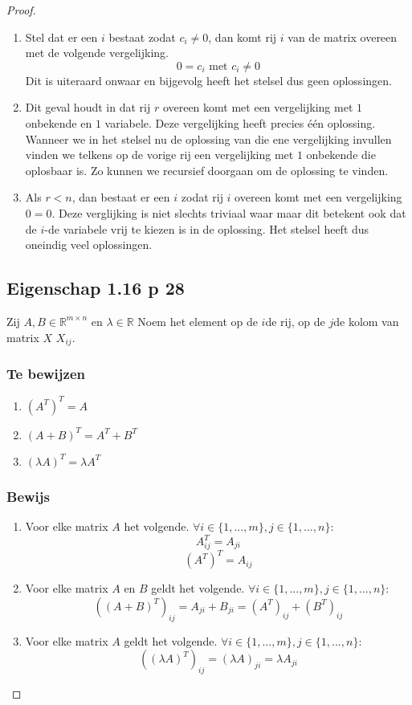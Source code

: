 \documentclass[lineaire_algebra_oplossingen.tex]{subfiles}
\begin{document}
\begin{proof}
\begin{enumerate}
\item Stel dat er een $i$ bestaat zodat $c_i \neq 0$, dan komt rij $i$ van de matrix overeen met de volgende vergelijking.
\[
0 = c_i \text{ met } c_i \neq 0
\]
Dit is uiteraard onwaar en bijgevolg heeft het stelsel dus geen oplossingen.
\item
Dit geval houdt in dat rij $r$ overeen komt met een vergelijking met $1$ onbekende en $1$ variabele. Deze vergelijking heeft precies \'e\'en oplossing. Wanneer we in het stelsel nu de oplossing van die ene vergelijking invullen vinden we telkens op de vorige rij een vergelijking met $1$ onbekende die oplosbaar is. Zo kunnen we recursief doorgaan om de oplossing te vinden.
\item
Als $r < n$, dan bestaat er een $i$ zodat rij $i$ overeen komt met een vergelijking $0=0$. Deze verglijking is niet slechts triviaal waar maar dit betekent ook dat de $i$-de variabele vrij te kiezen is in de oplossing. Het stelsel heeft dus oneindig veel oplossingen.
\end{enumerate}


\subsection{Eigenschap 1.16 p 28}
\label{1.16}
Zij $A,B \in \mathbb{R}^{m\times n} $ en $\lambda \in \mathbb{R}$
Noem het element op de $i$de rij, op de $j$de kolom van matrix $X$ $X_{ij}$.

\subsubsection*{Te bewijzen}
\begin{enumerate}
\item $(A^T)^T = A$
\item $(A+B)^T = A^T + B^T$
\item $(\lambda A)^T=\lambda A^T$
\end{enumerate}

\subsubsection*{Bewijs}
\begin{enumerate}
\item Voor elke matrix $A$ het volgende. $\forall i\in \{1,...,m\} ,j \in \{1,...,n\}:$
\[
A^T_{ij} = A_{ji}
\]
\[
(A^T)^T = A_{ij}
\]
\item Voor elke matrix $A$ en $B$ geldt het volgende. $\forall i\in \{1,...,m\} ,j \in \{1,...,n\}:$
\[
((A+B)^T)_{ij} = A_{ji}+B_{ji}= (A^T)_{ij} + (B^T)_{ij}
\]
\item Voor elke matrix $A$ geldt het volgende. $\forall i\in \{1,...,m\} ,j \in \{1,...,n\}:$
\[
((\lambda A)^T)_{ij} = (\lambda A)_{ji} = \lambda A_{ji}
\]
\end{enumerate}
\end{proof}
\end{document}
